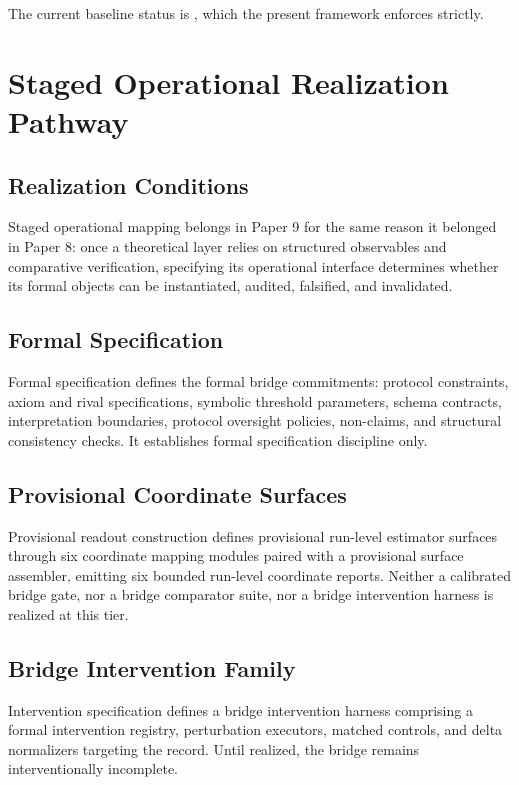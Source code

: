 \documentclass[11pt,a4paper]{article}
\theoremstyle{definition}
\begin{document}
The current baseline status is \texttt{\allowbreak{}\allowbreak{}}, which the present framework enforces strictly.

\section{Staged Operational Realization Pathway}
\subsection{Realization Conditions}
Staged operational mapping belongs in Paper 9 for the same reason it belonged in Paper 8: once a theoretical layer relies on structured observables and comparative verification, specifying its operational interface determines whether its formal objects can be instantiated, audited, falsified, and invalidated.

\subsection{Formal Specification}
Formal specification defines the formal bridge commitments: protocol constraints, axiom and rival specifications, symbolic threshold parameters, schema contracts, interpretation boundaries, protocol oversight policies, non-claims, and structural consistency checks. It establishes formal specification discipline only.

\subsection{Provisional Coordinate Surfaces}
Provisional readout construction defines provisional run-level estimator surfaces through six coordinate mapping modules paired with a provisional surface assembler, emitting six bounded run-level coordinate reports. Neither a calibrated bridge gate, nor a bridge comparator suite, nor a bridge intervention harness is realized at this tier.

\subsection{Bridge Intervention Family}
Intervention specification defines a bridge intervention harness comprising a formal intervention registry, perturbation executors, matched controls, and delta normalizers targeting the \texttt{\allowbreak{}\allowbreak{}\allowbreak{}} record. Until realized, the bridge remains interventionally incomplete.
\end{document}
